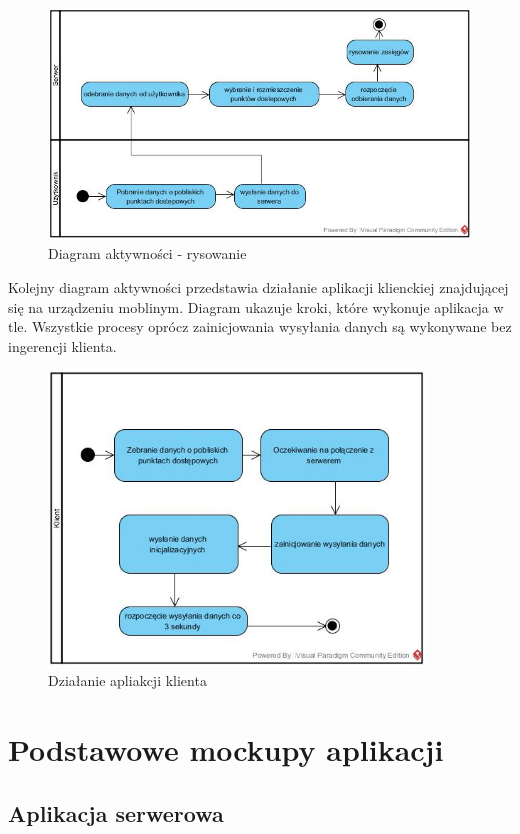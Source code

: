 \documentclass{article}
\begin{document}
\begin{figure}[H]
	\centering
	\includegraphics[width=15cm]{rysowanie.jpg}
	\caption{Diagram aktywności - rysowanie}
	\label{fig:rysowanie.jpg}
\end{figure}

\newpage
Kolejny diagram aktywności przedstawia działanie aplikacji klienckiej znajdującej się na urządzeniu moblinym. Diagram ukazuje kroki, które wykonuje aplikacja w tle. Wszystkie procesy oprócz zainicjowania wysyłania danych są wykonywane bez ingerencji klienta.

\begin{figure}[H]
	\centering
	\includegraphics[width=10cm]{klient.jpg}
	\caption{Działanie apliakcji klienta}
	\label{fig:klient.jpg}
\end{figure}

\newpage

\section{Podstawowe mockupy aplikacji}

\subsection{Aplikacja serwerowa}
\end{document}
